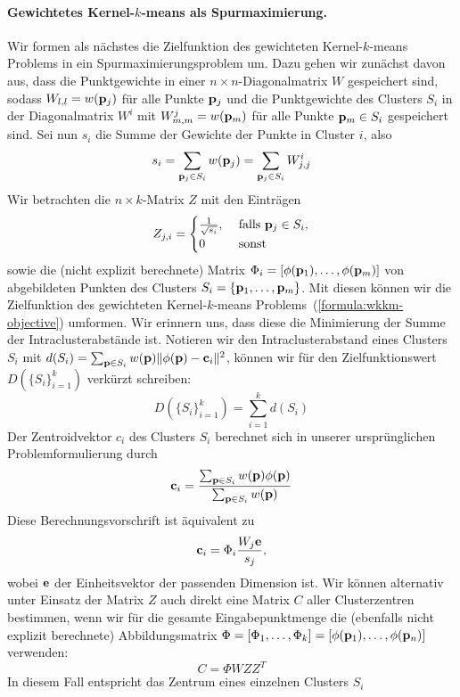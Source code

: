 \paragraph{Gewichtetes Kernel-$k$-means als Spurmaximierung.}
Wir formen als nächstes die Zielfunktion des gewichteten Kernel-$k$-means Problems in ein Spurmaximierungsproblem um.
Dazu gehen wir zunächst davon aus, dass die Punktgewichte in einer $n \times n$-Diagonalmatrix $W$ gespeichert sind, sodass
$W_{l,l} = w(\mathbf{p}_j)$ für alle Punkte $\mathbf{p}_j$ und die Punktgewichte des Clusters $S_i$ in der Diagonalmatrix
$W^i$ mit $W_{m,m}^j = w(\mathbf{p}_m)$ für alle Punkte $\mathbf{p}_m \in S_i$ gespeichert sind. 
\absatz
Sei nun $s_i$ die Summe der Gewichte der Punkte in Cluster $i$, also
\[ s_i = \sum_{\mathbf{p}_j \in S_i} w(\mathbf{p}_j) = \sum_{\mathbf{p}_j \in S_i} W_{j,j}^i \]
Wir betrachten die $n \times k$-Matrix $Z$ mit den Einträgen
\[ Z_{j, i} = 	\begin{cases}
					\frac{1}{\sqrt{s_i}}, & \textrm{ falls } \mathbf{p}_j \in S_i, \\
					0 & \textrm{ sonst }
				\end{cases} \]
sowie die (nicht explizit berechnete) Matrix $\Phi_i = [\phi(\mathbf{p}_1), \dots, \phi(\mathbf{p}_m)]$ von abgebildeten Punkten
des Clusters $S_i = \{ \mathbf{p}_1, \dots, \mathbf{p}_m \}$. Mit diesen können wir
die Zielfunktion des gewichteten Kernel-$k$-means Problems~(\ref{formula:wkkm-objective}) umformen. Wir erinnern uns, dass diese
die Minimierung der Summe der Intraclusterabstände ist. Notieren wir den Intraclusterabstand eines Clusters $S_i$ mit
$d(S_i) = \sum_{\mathbf{p} \in S_i} w(\mathbf{p}) \lVert {\phi(\ensuremath{\mathbf{p}})} - {\mathbf{c}_i} \rVert^2$, können wir für den Zielfunktionswert
$D(\{S_i\}_{i=1}^{k})$ verkürzt schreiben:
\[ D(\{S_i\}_{i=1}^{k}) = \sum_{i=1}^k d(S_i) \]
Der Zentroidvektor $c_i$ des Clusters $S_i$ berechnet sich in unserer ursprünglichen Problemformulierung durch
\[ \mathbf{c}_i = \frac{\sum_{\mathbf{p} \in S_i} w(\mathbf{p}) \phi(\mathbf{p})}{\sum_{\mathbf{p} \in S_i} w(\mathbf{p})} \]
Diese Berechnungsvorschrift ist äquivalent zu
\[ \mathbf{c}_i = \Phi_i \frac{W_j \mathbf{e}}{s_j}, \]
wobei $\mathbf{e}$ der Einheitsvektor der passenden Dimension ist.
Wir können alternativ unter Einsatz der Matrix $Z$ auch direkt eine Matrix $C$ aller Clusterzentren bestimmen,
wenn wir für die gesamte Eingabepunktmenge die (ebenfalls nicht explizit berechnete) Abbildungsmatrix
$\Phi = [\Phi_1, \dots, \Phi_k] = [\phi(\mathbf{p}_1), \dots, \phi(\mathbf{p}_n)]$ verwenden:
\[ C = \Phi W Z Z^T \]
In diesem Fall entspricht das Zentrum eines einzelnen Clusters $S_i$
